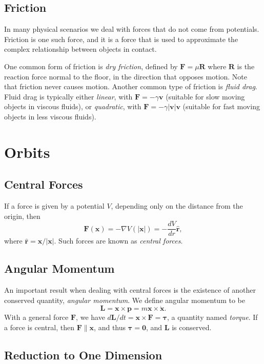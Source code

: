 \documentclass[11pt, a4paper]{scrartcl}
\newcommand{\vv}[1]{\boldsymbol{\mathbf{#1}}}
\theoremstyle{definition}
\newcommand{\hh}[1]{\hat{\vv{#1}}}
\begin{document}
\subsection*{Friction}

In many physical scenarios we deal with forces that do not come from potentials. Friction is one such force, and it is a force that is used to approximate the complex relationship between objects in contact.

One common form of friction is \emph{dry friction}, defined by $\vv F = \mu \vv R$ where $\vv R$ is the reaction force normal to the floor, in the direction that opposes motion. Note that friction never causes motion. Another common type of friction is \emph{fluid drag}. Fluid drag is typically either \emph{linear}, with $\vv F = - \gamma \vv v$ (suitable for slow moving objects in viscous fluids), or \emph{quadratic}, with $\vv F = - \gamma |\vv v| \vv v$ (suitable for fast moving objects in less viscous fluids).


\clearpage

\section{Orbits}


\subsection*{Central Forces}

If a force is given by a potential $V$, depending only on the distance from the origin, then
$$
\vv F(\vv x) = - \nabla V(|\vv x|) = - \frac{dV}{dr} \hh r,
$$
where $\hh r = \vv x/|\vv x|$. Such forces are known as \emph{central forces}.

\subsection*{Angular Momentum}

An important result when dealing with central forces is the existence of another conserved quantity, \emph{angular momentum}. We define angular momentum to be
$$
\vv L = \vv x \times \vv p = m \vv x \times \dot{\vv x}.
$$
With a general force $\vv F$, we have $d \vv L/dt = \vv x \times \vv F = \vv \tau$, a quantity named \emph{torque}. If a force is central, then $\vv F \parallel \vv x$, and thus $\vv \tau = \vv 0$, and $\vv L$ is conserved.

\subsection*{Reduction to One Dimension}
\end{document}
